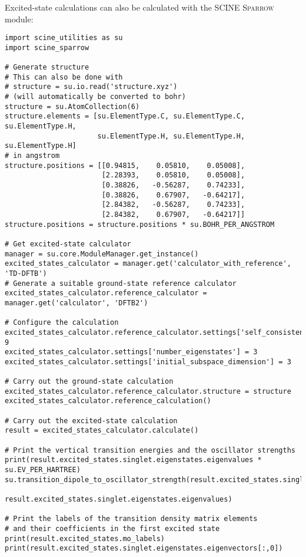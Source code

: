 \documentclass[]{tufte-book}
\begin{document}
Excited-state calculations can also be calculated with the SCINE \textsc{Sparrow} module:
\begin{verbatim}
import scine_utilities as su
import scine_sparrow

# Generate structure
# This can also be done with 
# structure = su.io.read('structure.xyz')
# (will automatically be converted to bohr)
structure = su.AtomCollection(6)
structure.elements = [su.ElementType.C, su.ElementType.C, su.ElementType.H, 
                      su.ElementType.H, su.ElementType.H, su.ElementType.H]
# in angstrom                                                                
structure.positions = [[0.94815,    0.05810,    0.05008], 
                       [2.28393,    0.05810,    0.05008],       
                       [0.38826,   -0.56287,    0.74233],       
                       [0.38826,    0.67907,   -0.64217],       
                       [2.84382,   -0.56287,    0.74233],       
                       [2.84382,    0.67907,   -0.64217]]
structure.positions = structure.positions * su.BOHR_PER_ANGSTROM

# Get excited-state calculator
manager = su.core.ModuleManager.get_instance()
excited_states_calculator = manager.get('calculator_with_reference', 'TD-DFTB')
# Generate a suitable ground-state reference calculator
excited_states_calculator.reference_calculator = manager.get('calculator', 'DFTB2')

# Configure the calculation
excited_states_calculator.reference_calculator.settings['self_consistence_criterion']=1e-9
excited_states_calculator.settings['number_eigenstates'] = 3
excited_states_calculator.settings['initial_subspace_dimension'] = 3

# Carry out the ground-state calculation
excited_states_calculator.reference_calculator.structure = structure
excited_states_calculator.reference_calculation()

# Carry out the excited-state calculation
result = excited_states_calculator.calculate()

# Print the vertical transition energies and the oscillator strengths
print(result.excited_states.singlet.eigenstates.eigenvalues * su.EV_PER_HARTREE)
su.transition_dipole_to_oscillator_strength(result.excited_states.singlet.transition_dipoles, 
                                            result.excited_states.singlet.eigenstates.eigenvalues)

# Print the labels of the transition density matrix elements
# and their coefficients in the first excited state
print(result.excited_states.mo_labels)
print(result.excited_states.singlet.eigenstates.eigenvectors[:,0])
\end{verbatim}
\end{document}
